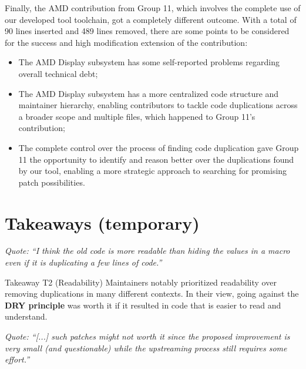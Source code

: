 \documentclass[10pt,conference]{IEEEtran}
\newenvironment{highlight-box}[1]{%
  \begin{tcolorbox}
  \textbf{#1:} \itshape}{\end{tcolorbox}}
\begin{document}
Finally, the AMD contribution from Group 11, which involves the complete use of our developed tool toolchain, got a completely different outcome. With a total of 90 lines inserted and 489 lines removed, there are some points to be considered for the success and high modification extension of the contribution:

\begin{itemize}
    \item The AMD Display subsystem has some self-reported problems regarding overall technical debt;
    \item The AMD Display subsystem has a more centralized code structure and maintainer hierarchy, enabling contributors to tackle code duplications across a broader scope and multiple files, which happened to Group 11's contribution;
    \item The complete control over the process of finding code duplication gave Group 11 the opportunity to identify and reason better over the duplications found by our tool, enabling a more strategic approach to searching for promising patch possibilities. 
\end{itemize}

\section{Takeaways (temporary)}

\noindent
\begin{footnotesize}
  \textit{
    Quote: ``I think the old code is more readable than hiding the values in a macro
    even if it is duplicating a few lines of code.''
  }
\end{footnotesize}

\begin{highlight-box}{Takeaway T2 (Readability)}
  Maintainers notably prioritized readability over removing duplications in
  many different contexts. In their view, going against the \textbf{DRY
  principle} was worth it if it resulted in code that is easier to read and
  understand.
\end{highlight-box}

\noindent
\begin{footnotesize}
\textit{
    Quote: ``[...] such patches might not worth it since the proposed
    improvement is very small (and questionable) while the upstreaming process
    still requires some effort.''
  }
\end{footnotesize}
\end{document}
